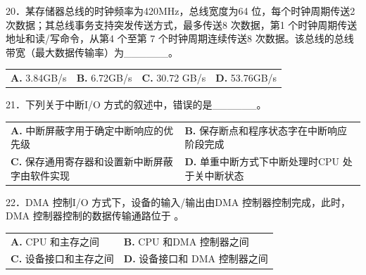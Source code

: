 \documentclass[UTF8,11pt]{ctexart}
\begin{document}
20．某存储器总线的时钟频率为420MHz，总线宽度为64 位，每个时钟周期传送2 次数据；其总线事务支持突发传送方式，最多传送8 次数据，第1 个时钟周期传送地址和读/写命令，从第4 个至第 7 个时钟周期连续传送8 次数据。该总线的总线带宽（最大数据传输率）为\_\_\_\_\_\_。


\begin{center}\begin{tabular}{>{\raggedright\arraybackslash}p{\dimexpr(\linewidth-8\tabcolsep)/4\relax}>{\raggedright\arraybackslash}p{\dimexpr(\linewidth-8\tabcolsep)/4\relax}>{\raggedright\arraybackslash}p{\dimexpr(\linewidth-8\tabcolsep)/4\relax}>{\raggedright\arraybackslash}p{\dimexpr(\linewidth-8\tabcolsep)/4\relax}}
\textbf{A.} 3.\allowbreak{}84GB/s & \textbf{B.} 6.\allowbreak{}72GB/s & \textbf{C.} 30.\allowbreak{}72 GB/s & \textbf{D.} 53.\allowbreak{}76GB/s\\[.35em]\end{tabular}\end{center}

21．下列关于中断I/O 方式的叙述中，错误的是\_\_\_\_\_\_。


\begin{center}\begin{tabular}{>{\raggedright\arraybackslash}p{\dimexpr(\linewidth-4\tabcolsep)/2\relax}>{\raggedright\arraybackslash}p{\dimexpr(\linewidth-4\tabcolsep)/2\relax}}
\textbf{A.} 中断屏蔽字用于确定中断响应的优先级 & \textbf{B.} 保存断点和程序状态字在中断响应阶段完成\\[.35em]
\textbf{C.} 保存通用寄存器和设置新中断屏蔽字由软件实现 & \textbf{D.} 单重中断方式下中断处理时CPU 处于关中断状态\\[.35em]\end{tabular}\end{center}

22．DMA 控制I/O 方式下，设备的输入/输出由DMA 控制器控制完成，此时，DMA 控制器控制的数据传输通路位于 。


\begin{center}\begin{tabular}{>{\raggedright\arraybackslash}p{\dimexpr(\linewidth-4\tabcolsep)/2\relax}>{\raggedright\arraybackslash}p{\dimexpr(\linewidth-4\tabcolsep)/2\relax}}
\textbf{A.} CPU 和主存之间 & \textbf{B.} CPU 和DMA 控制器之间\\[.35em]
\textbf{C.} 设备接口和主存之间 & \textbf{D.} 设备接口和 DMA 控制器之间\\[.35em]\end{tabular}\end{center}
\end{document}
